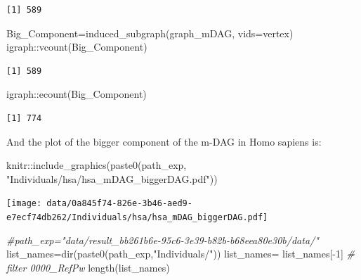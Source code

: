 \documentclass[
  letterpaper,
  DIV=11,
  numbers=noendperiod]{scrreprt}
\newenvironment{Shaded}{}{}
\newcommand{\AttributeTok}[1]{\textcolor[rgb]{0.78,0.47,0.87}{#1}}
\newcommand{\CommentTok}[1]{\textcolor[rgb]{0.36,0.39,0.44}{\textit{#1}}}
\newcommand{\DecValTok}[1]{\textcolor[rgb]{0.82,0.60,0.40}{#1}}
\newcommand{\FunctionTok}[1]{\textcolor[rgb]{0.38,0.69,0.94}{#1}}
\newcommand{\NormalTok}[1]{\textcolor[rgb]{0.67,0.70,0.75}{#1}}
\newcommand{\OtherTok}[1]{\textcolor[rgb]{0.15,0.68,0.38}{#1}}
\newcommand{\SpecialCharTok}[1]{\textcolor[rgb]{0.34,0.71,0.76}{#1}}
\newcommand{\StringTok}[1]{\textcolor[rgb]{0.60,0.76,0.47}{#1}}
\begin{document}
\begin{verbatim}
[1] 589
\end{verbatim}

\begin{Shaded}
\begin{Highlighting}[]
\NormalTok{Big\_Component}\OtherTok{=}\FunctionTok{induced\_subgraph}\NormalTok{(graph\_mDAG, }\AttributeTok{vids=}\NormalTok{vertex)}
\NormalTok{igraph}\SpecialCharTok{::}\FunctionTok{vcount}\NormalTok{(Big\_Component)}
\end{Highlighting}
\end{Shaded}

\begin{verbatim}
[1] 589
\end{verbatim}

\begin{Shaded}
\begin{Highlighting}[]
\NormalTok{igraph}\SpecialCharTok{::}\FunctionTok{ecount}\NormalTok{(Big\_Component)}
\end{Highlighting}
\end{Shaded}

\begin{verbatim}
[1] 774
\end{verbatim}

And the plot of the bigger component of the m-DAG in Homo sapiens is:

\begin{Shaded}
\begin{Highlighting}[]
\NormalTok{knitr}\SpecialCharTok{::}\FunctionTok{include\_graphics}\NormalTok{(}\FunctionTok{paste0}\NormalTok{(path\_exp,}
                               \StringTok{"Individuals/hsa/hsa\_mDAG\_biggerDAG.pdf"}\NormalTok{))}
\end{Highlighting}
\end{Shaded}

\begin{center}
\texttt{[image: data/0a845f74-826e-3b46-aed9-e7ecf74db262/Individuals/hsa/hsa\_mDAG\_biggerDAG.pdf]}
\end{center}

\begin{Shaded}
\begin{Highlighting}[]
\CommentTok{\#path\_exp="data/result\_bb261b6e{-}95c6{-}3e39{-}b82b{-}b68eea80e30b/data/" }
\NormalTok{list\_names}\OtherTok{=}\FunctionTok{dir}\NormalTok{(}\FunctionTok{paste0}\NormalTok{(path\_exp,}\StringTok{"Individuals/"}\NormalTok{))}
\NormalTok{list\_names}\OtherTok{=}\NormalTok{ list\_names[}\SpecialCharTok{{-}}\DecValTok{1}\NormalTok{] }\CommentTok{\# filter 0000\_RefPw}
\FunctionTok{length}\NormalTok{(list\_names) }
\end{Highlighting}
\end{Shaded}
\end{document}

